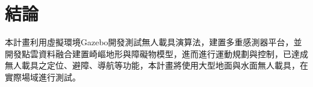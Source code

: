 \section{結論}

本計畫利用虛擬環境Gazebo開發測試無人載具演算法，建置多重感測器平台，並開發點雲資料融合建置崎嶇地形與障礙物模型，進而進行運動規劃與控制，已達成無人載具之定位、避障、導航等功能，本計畫將使用大型地面與水面無人載具，在實際場域進行測試。
